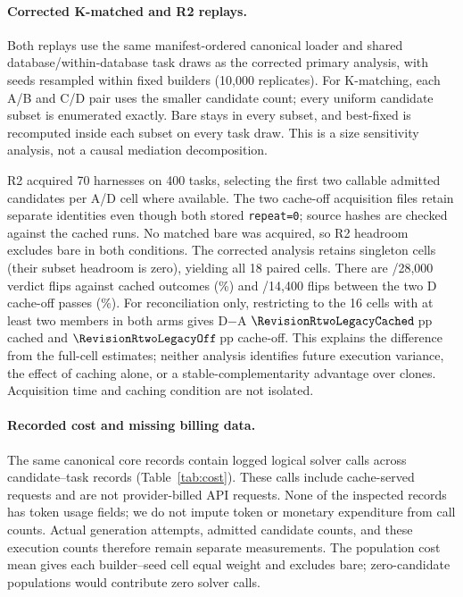 \paragraph{Corrected K-matched and R2 replays.}\label{app:r2}
Both replays use the same manifest-ordered canonical loader and shared
database/within-database task draws as the corrected primary analysis,
with seeds resampled within fixed builders (10{,}000 replicates).
For K-matching, each A/B and C/D pair uses the smaller candidate count;
every uniform candidate subset is enumerated exactly. Bare stays in every
subset, and best-fixed is recomputed inside each subset on every task draw.
This is a size sensitivity analysis, not a causal mediation decomposition.

R2 acquired 70 harnesses on 400 tasks, selecting the first two callable
admitted candidates per A/D cell where available. The two cache-off
acquisition files retain separate identities even though both stored
\texttt{repeat=0}; source hashes are checked against the cached runs.
No matched bare was acquired, so R2 headroom excludes bare in both
conditions. The corrected analysis retains singleton cells (their subset
headroom is zero), yielding all 18 paired cells.
There are \RevisionRtwoFlips/28{,}000 verdict flips against cached outcomes
(\RevisionRtwoFlipPercent\%) and
\RevisionRtwoRepeatFlips/14{,}400 flips between the two D cache-off passes
(\RevisionRtwoRepeatPercent\%).
For reconciliation only, restricting to the 16 cells with at least two
members in both arms gives D$-$A $\RevisionRtwoLegacyCached$\,pp cached
and $\RevisionRtwoLegacyOff$\,pp cache-off. This explains the difference
from the full-cell estimates; neither analysis identifies future execution
variance, the effect of caching alone, or a stable-complementarity advantage
over clones. Acquisition time and caching condition are not isolated.

\begin{table}[t]
\centering\small

\caption{Corrected sensitivities on core-400, 18 cells. CIs are unadjusted.
K-matched comparisons always retain bare; R2 comparisons exclude bare and
are conditional on the observed acquisition groups.}
\label{tab:sensitivity}
\end{table}

\paragraph{Recorded cost and missing billing data.}
The same canonical core records contain \RevisionLogicalCalls{} logged
logical solver calls across \RevisionCostRows{} candidate--task records
(Table~\ref{tab:cost}). These calls include cache-served requests and are
not provider-billed API requests. None of the inspected records has token
usage fields; we do not impute token or monetary expenditure from call
counts. Actual generation attempts, admitted candidate counts, and these
execution counts therefore remain separate measurements. The population
cost mean gives each builder--seed cell equal weight and excludes bare;
zero-candidate populations would contribute zero solver calls.

